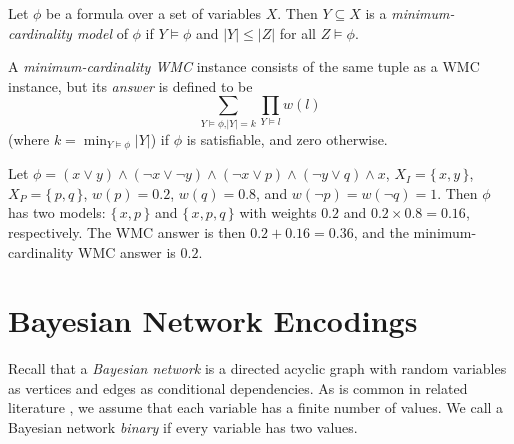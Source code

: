 \begin{definition}
  Let $\phi$ be a formula over a set of variables $X$. Then $Y \subseteq X$ is a
  \emph{minimum-cardinality model} of $\phi$ if $Y \models \phi$ and $|Y| \le
  |Z|$ for all $Z \models \phi$.
\end{definition}

\begin{definition}\label{def:mcwmc}
  A \emph{minimum-cardinality WMC} instance consists of the same tuple as a WMC
  instance, but its \emph{answer} is defined to be
  \[
  \sum_{Y \models \phi\text{,}|Y| = k} \prod_{Y \models l} w(l)
  \]
  (where $k = \min_{Y \models \phi} |Y|$) if $\phi$ is satisfiable, and zero otherwise.
\end{definition}

\begin{example}\label{example:1}
  Let
  $\phi = (x \lor y) \land (\neg x \lor \neg y) \land (\neg x \lor p) \land (\neg y \lor q) \land x$,
  $X_I = \{\, x, y \,\}$, $X_P = \{\, p, q \,\}$, $w(p) = 0.2$, $w(q) = 0.8$,
  and $w(\neg p) = w(\neg q) = 1$. Then $\phi$ has two models: $\{\, x, p \,\}$
  and $\{\, x, p, q \,\}$ with weights $0.2$ and $0.2 \times 0.8 = 0.16$,
  respectively. The WMC answer is then $0.2 + 0.16 = 0.36$, and the
  minimum-cardinality WMC answer is $0.2$.
\end{example}

\section{Bayesian Network Encodings}\label{sec:encodings}

Recall that a \emph{Bayesian network} is a directed acyclic graph with random
variables as vertices and edges as conditional dependencies. As is common in
related literature \citep{DBLP:conf/kr/Darwiche02,DBLP:conf/aaai/SangBK05}, we
assume that each variable has a finite number of values. We call a Bayesian
network \emph{binary} if every variable has two values.

